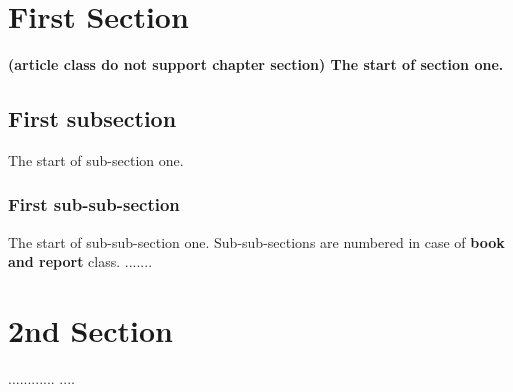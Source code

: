 \documentclass{article}
\begin{document}
	\section{First Section}
	\bfseries\huge (article class do not support  chapter section) \normalfont\normalsize The start of section one.
	\subsection{First subsection}
	The start of sub-section one.
	\subsubsection{First sub-sub-section}
	The start of sub-sub-section one. Sub-sub-sections are numbered in case of {\bf\Huge book and report} class.
	\newpage
	.......
    \newpage
    \section{2nd Section}
    ............
    \newpage
    ....
\end{document}
